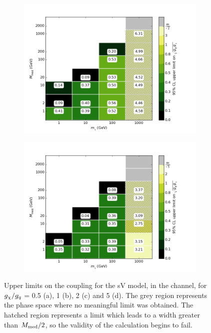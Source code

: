 \begin{figure}[t]
\begin{subfigure}[t]{0.495\textwidth}
      \includegraphics[width=1.\textwidth]{figures/grid_basepoints_SVD_rat2_monojet.png}
      \caption{}
    \end{subfigure}
    \begin{subfigure}[t]{0.495\textwidth}
      \centering
      \includegraphics[width=1.\textwidth]{figures/grid_basepoints_SVD_rat5_monojet.png}
      \caption{}
    \end{subfigure}
    \caption{Upper limits on the coupling for the sV model, in the \monojet channel, for $g_{\chi} / g_q$ = 0.5 (a), 1 (b), 2 (c) and 5 (d). The grey region represents the phase space where no meaningful limit was obtained. The hatched region represents a limit which leads to a width greater than $M_{\mathrm{med}} / 2$, so the validity of the calculation begins to fail.}
    \label{fig:Monojet_SVD_couplinglimit}
\end{figure}

